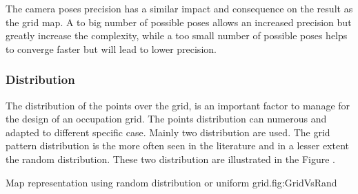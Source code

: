 The camera poses precision has a similar impact and consequence on the result as the grid map.
A to big  number of possible poses allows an increased precision but greatly increase the complexity, while a too small  number of possible poses helps to converge faster but will lead to lower precision. 
\subsubsection{Distribution}
The distribution of the points over the grid, is an important factor to manage for the design of an occupation grid.%
 The points distribution can numerous and adapted to different specific case. Mainly two distribution are used. The grid pattern distribution is the more often seen in the literature and in a lesser extent the random distribution. These two distribution  are illustrated in the Figure .

\begin{mfigures}[!]
{Map representation using random distribution or uniform grid.}{fig:GridVsRand} \centering
{}
\hspace{1cm}
\end{mfigures}

